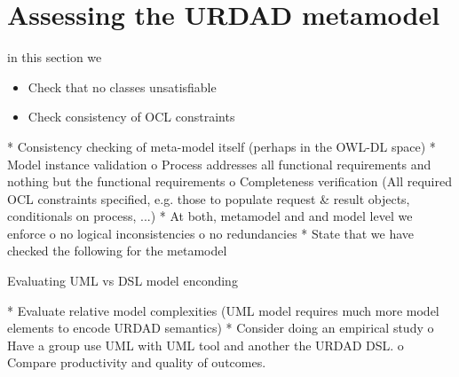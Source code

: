 \section{Assessing the URDAD metamodel}

in this section we
\begin{itemize}
  \item Check that no classes unsatisfiable
  \item Check consistency of OCL constraints
\end{itemize}

    * Consistency checking of meta-model itself (perhaps in the OWL-DL space)
    * Model instance validation
          o Process addresses all functional requirements and nothing but the functional requirements
          o Completeness verification (All required OCL constraints specified, e.g. those to populate request & result objects, conditionals on process, ...) 
    * At both, metamodel and and model level we enforce
          o no logical inconsistencies
          o no redundancies 
    * State that we have checked the following for the metamodel 

Evaluating UML vs DSL model enconding

    * Evaluate relative model complexities (UML model requires much more model elements to encode URDAD semantics)
    * Consider doing an empirical study
          o Have a group use UML with UML tool and another the URDAD DSL.
          o Compare productivity and quality of outcomes. 

